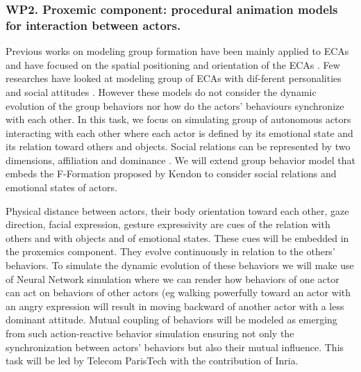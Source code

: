 

\subsubsection{WP2. Proxemic component: procedural animation models for interaction between actors.}

Previous works on modeling group formation have been mainly applied to ECAs and have focused on the spatial positioning and orientation of the ECAs \cite{Pedica2010}. Few researches have looked at modeling group of ECAs with dif-ferent personalities and social attitudes \cite{Gillies2004,Prada2005}. However these models do not consider the dynamic evolution of the group behaviors nor how do the actors' behaviours synchronize with each other. In this task, we focus on simulating group of autonomous actors interacting with each other where each actor is defined by its emotional state and its relation toward others and objects. Social relations can be represented by two dimensions, affiliation and dominance \cite{Wiggins1979}. We will extend group behavior model \cite{Pedica2010} that embeds the F-Formation proposed by Kendon \cite{Kendon2004} to consider social relations and emotional states of actors. 

Physical distance between actors, their body orientation toward each other, gaze direction, facial expression, gesture expressivity are cues of the relation with others and with objects and of emotional states. These cues will be embedded in the proxemics component. They evolve continuously in relation to the others' behaviors. To simulate the dynamic evolution of these behaviors we will make use of Neural Network simulation \cite{Prepin2013} where we can render how behaviors of one actor can act on behaviors of other actors (eg walking powerfully toward an actor with an angry expression will result in moving backward of another actor with a less dominant attitude. Mutual coupling of behaviors will be modeled as emerging from such action-reactive behavior simulation \cite{Prepin2013} ensuring not only the synchronization between actors' behaviors but also their mutual influence. This task will be led by Telecom ParisTech with the contribution of Inria.



\endinput